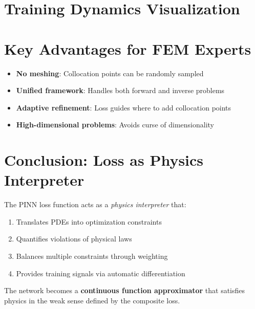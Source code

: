 \documentclass[12pt]{article}
\begin{document}
\section*{Training Dynamics Visualization}
\begin{center}
\end{center}

\section*{Key Advantages for FEM Experts}
\begin{itemize}
    \item \textbf{No meshing}: Collocation points can be randomly sampled
    \item \textbf{Unified framework}: Handles both forward and inverse problems
    \item \textbf{Adaptive refinement}: Loss guides where to add collocation points
    \item \textbf{High-dimensional problems}: Avoids curse of dimensionality
\end{itemize}

\section*{Conclusion: Loss as Physics Interpreter}
The PINN loss function acts as a \textit{physics interpreter} that:
\begin{enumerate}
    \item Translates PDEs into optimization constraints
    \item Quantifies violations of physical laws
    \item Balances multiple constraints through weighting
    \item Provides training signals via automatic differentiation
\end{enumerate}
The network becomes a \textbf{continuous function approximator} that satisfies physics in the weak sense defined by the composite loss.
\end{document}
